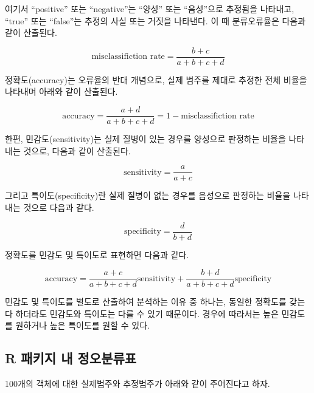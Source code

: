 \documentclass[]{book}
\begin{document}
여기서 ``positive'' 또는 ``negative''는 ``양성'' 또는 ``음성''으로 추정됨을 나타내고, ``true'' 또는 ``false''는 추정의 사실 또는 거짓을 나타낸다. 이 때 분류오류율은 다음과 같이 산출된다.

\begin{equation}
\text{misclassifiction rate} = \frac{b + c}{a + b + c + d}
\label{eq:cm-misclassification-rate}
\end{equation}

정확도(accuracy)는 오류율의 반대 개념으로, 실제 범주를 제대로 추정한 전체 비율을 나타내며 아래와 같이 산출된다.

\begin{equation}
\text{accuracy} = \frac{a + d}{a + b + c + d} = 1 - \text{misclassifiction rate}
\label{eq:cm-accuracy}
\end{equation}

한편, 민감도(sensitivity)는 실제 질병이 있는 경우를 양성으로 판정하는 비율을 나타내는 것으로, 다음과 같이 산출된다.

\begin{equation}
\text{sensitivity} = \frac{a}{a + c}
\label{eq:cm-sensitivity}
\end{equation}

그리고 특이도(specificity)란 실제 질병이 없는 경우를 음성으로 판정하는 비율을 나타내는 것으로 다음과 같다.

\begin{equation}
\text{specificity} = \frac{d}{b + d}
\label{eq:cm-specificity}
\end{equation}

정확도를 민감도 및 특이도로 표현하면 다음과 같다.

\begin{equation*}
\text{accuracy} = \frac{a + c}{a + b + c + d}\text{sensitivity} + \frac{b + d}{a + b + c + d}\text{specificity}
\end{equation*}

민감도 및 특이도를 별도로 산출하여 분석하는 이유 중 하나는, 동일한 정확도를 갖는다 하더라도 민감도와 특이도는 다를 수 있기 때문이다. 경우에 따라서는 높은 민감도를 원하거나 높은 특이도를 원할 수 있다.

\hypertarget{confusion-matrix-r-package}{%
\subsection{R 패키지 내 정오분류표}\label{confusion-matrix-r-package}}

100개의 객체에 대한 실제범주와 추정범주가 아래와 같이 주어진다고 하자.
\end{document}
